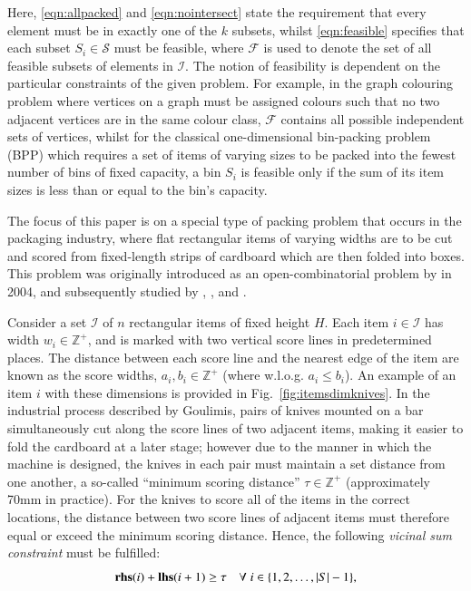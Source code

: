 \documentclass[authoryear]{elsarticle}
\begin{document}
\noindent Here, \eqref{eqn:allpacked} and \eqref{eqn:nointersect} state the requirement that every element must be in exactly one of the $k$ subsets, whilst \eqref{eqn:feasible} specifies that each subset $S_i \in \mathcal{S}$ must be feasible, where $\mathcal{F}$ is used to denote the set of all feasible subsets of elements in $\mathcal{I}$. The notion of feasibility is dependent on the particular constraints of the given problem. For example, in the graph colouring problem where vertices on a graph must be assigned colours such that no two adjacent vertices are in the same colour class, $\mathcal{F}$ contains all possible independent sets of vertices, whilst for the classical one-dimensional bin-packing problem (BPP) which requires a set of items of varying sizes to be packed into the fewest number of bins of fixed capacity, a bin $S_i$ is feasible only if the sum of its item sizes is less than or equal to the bin's capacity.

The focus of this paper is on a special type of packing problem that occurs in the packaging industry, where flat rectangular items of varying widths are to be cut and scored from fixed-length strips of cardboard which are then folded into boxes. This problem was originally introduced as an open-combinatorial problem by \citeauthor{goulimis2004} in 2004, and subsequently studied by \citet{lewis2011}, \citet{becker2015}, and \citet{hawa2018}.

Consider a set $\mathcal{I}$ of $n$ rectangular items of fixed height $H$. Each item $i \in \mathcal{I}$ has width $w_i \in \mathbb{Z}^+$, and is marked with two vertical score lines in predetermined places. The distance between each score line and the nearest edge of the item are known as the score widths, $a_i, b_i \in \mathbb{Z}^+$ (where w.l.o.g. $a_i \leq b_i$). An example of an item $i$ with these dimensions is provided in Fig.~\ref{fig:itemsdimknives}. In the industrial process described by Goulimis, pairs of knives mounted on a bar simultaneously cut along the score lines of two adjacent items, making it easier to fold the cardboard at a later stage; however due to the manner in which the machine is designed, the knives in each pair must maintain a set distance from one another, a so-called ``minimum scoring distance'' $\tau \in \mathbb{Z}^+$ (approximately 70mm in practice). For the knives to score all of the items in the correct locations, the distance between two score lines of adjacent items must therefore equal or exceed the minimum scoring distance. Hence, the following \emph{vicinal sum constraint} must be fulfilled:
\begin{equation}
	\textbf{rhs}(i) + \textbf{lhs}(i+1) \geq \tau \quad \forall \hspace{1mm} i \in \{1,2,\dotsc,|S|- 1\},
	\label{eqn:vsc}
\end{equation}
\end{document}
